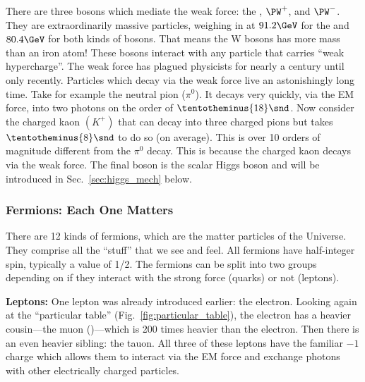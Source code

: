 There are three bosons which mediate the weak force: the \PZ, $\PW^+$, and $\PW^-$.
They are extraordinarily massive particles, weighing in at $91.2\GeV$ for the \PZ and $80.4\GeV$ for both kinds of \PW bosons. 
That means the W bosons has more mass than an iron atom!
These bosons interact with any particle that carries ``weak hypercharge''.
The weak force has plagued physicists for nearly a century until only recently.
Particles which decay via the weak force live an astonishingly long time. 
Take for example the neutral pion ($\pi^0$). 
It decays very quickly, via the EM force, into two photons on the order of $\tentotheminus{18}\snd$.
Now consider the charged kaon $(K^+)$ that can decay into three charged pions but takes $\tentotheminus{8}\snd$ to do so (on average).
This is over 10 orders of magnitude different from the $\pi^0$ decay.
This is because the charged kaon decays via the weak force.
The final boson is the scalar Higgs boson and will be introduced in Sec.~\ref{sec:higgs_mech} below.


\subsubsection{Fermions: Each One Matters}
There are 12 kinds of fermions, which are the matter particles of the Universe. 
They comprise all the ``stuff'' that we see and feel.
All fermions have half-integer spin, typically a value of 1/2. 
The fermions can be split into two groups depending on if they interact with the strong force (quarks) or not (leptons).

{\bf Leptons:}
One lepton was already introduced earlier: the electron.
Looking again at the ``particular table'' (Fig.~\ref{fig:particular_table}), the electron has a heavier cousin---the muon (\Pmu)---which is 200 times heavier than the electron. 
Then there is an even heavier sibling: the tauon. 
All three of these leptons have the familiar $-1$ charge which allows them to interact via the EM force and exchange photons with other electrically charged particles.

